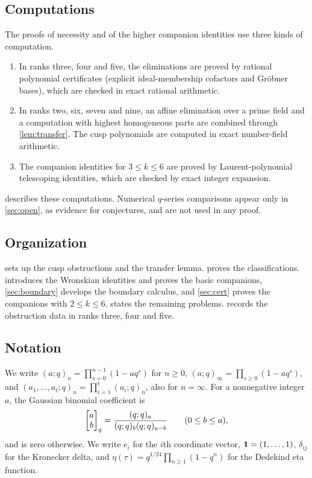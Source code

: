 \subsection{Computations}\label{subsec:computation}
The proofs of necessity and of the higher companion identities use three kinds of computation.
\begin{enumerate}
\item In ranks three, four and five, the eliminations are proved by rational polynomial certificates (explicit ideal-membership cofactors and Gr\"obner bases), which are checked in exact rational arithmetic.
\item In ranks two, six, seven and nine, an affine elimination over a prime field and a computation with highest homogeneous parts are combined through \cref{lem:transfer}. The cusp polynomials are computed in exact number-field arithmetic.
\item The companion identities for $3\le k\le6$ are proved by Laurent-polynomial telescoping identities, which are checked by exact integer expansion.
\end{enumerate}
 describes these computations. Numerical $q$-series comparisons appear only in \cref{sec:open}, as evidence for conjectures, and are not used in any proof.

\subsection{Organization}
 sets up the cusp obstructions and the transfer lemma.  proves the classifications.  introduces the Wronskian identities and proves the basic companions, \cref{sec:boundary} develops the boundary calculus, and \cref{sec:cert} proves the companions with $2\le k\le6$.  states the remaining problems.  records the obstruction data in ranks three, four and five.

\subsection{Notation}
We write $(a;q)_n=\prod_{s=0}^{n-1}(1-aq^s)$ for $n\ge0$, $(a;q)_\infty=\prod_{s\ge0}(1-aq^s)$, and $(a_1,\dots,a_t;q)_n=\prod_{i=1}^t(a_i;q)_n$, also for $n=\infty$. For a nonnegative integer $a$, the Gaussian binomial coefficient is
\[
\begin{bmatrix}a\\b\end{bmatrix}_q=\frac{(q;q)_a}{(q;q)_b(q;q)_{a-b}}\qquad(0\le b\le a),
\]
and is zero otherwise. We write $e_i$ for the $i$th coordinate vector, $\mathbf{1}=(1,\dots,1)$, $\delta_{ij}$ for the Kronecker delta, and $\eta(\tau)=q^{1/24}\prod_{n\ge1}(1-q^n)$ for the Dedekind eta function.
